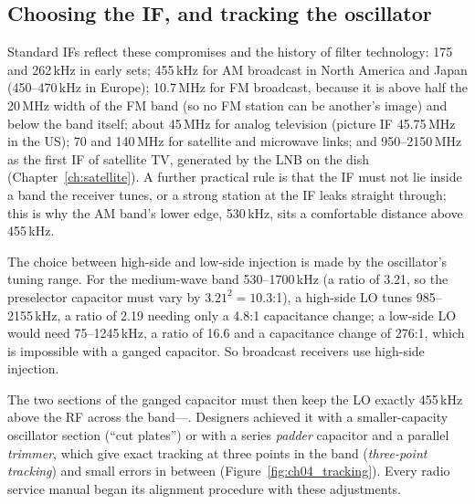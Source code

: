 \subsection{Choosing the IF, and tracking the oscillator}

Standard IFs reflect these compromises and the history of filter technology: 175 and 262\,kHz in early sets;
455\,kHz for AM broadcast in North America and Japan (450--470\,kHz in Europe); 10.7\,MHz for FM broadcast,
because it is above half the 20\,MHz width of the FM band (so no FM station can be another's image) and below
the band itself; about 45\,MHz for analog television (picture IF 45.75\,MHz in the US); 70 and 140\,MHz for
satellite and microwave links; and 950--2150\,MHz as the first IF of satellite TV, generated by the LNB on the
dish (Chapter~\ref{ch:satellite}). A further practical rule is that the IF must not lie inside a band the
receiver tunes, or a strong station at the IF leaks straight through; this is why the AM band's lower edge,
530\,kHz, sits a comfortable distance above 455\,kHz.

The choice between high-side and low-side injection is made by the oscillator's tuning range. For the
medium-wave band 530--1700\,kHz (a ratio of 3.21, so the preselector capacitor must vary by $3.21^2=10.3$:1),
a high-side LO tunes 985--2155\,kHz, a ratio of 2.19 needing only a 4.8:1 capacitance change; a low-side LO
would need 75--1245\,kHz, a ratio of 16.6 and a capacitance change of 276:1, which is impossible with a ganged
capacitor. So broadcast receivers use high-side injection.

The two sections of the ganged capacitor must then keep the LO exactly 455\,kHz above the RF across the
band---. Designers achieved it with a smaller-capacity oscillator section (``cut plates'') or
with a series \emph{padder} capacitor and a parallel \emph{trimmer}, which give exact tracking at three points
in the band (\emph{three-point tracking}) and small errors in between (Figure~\ref{fig:ch04_tracking}). Every
radio service manual began its alignment procedure with these adjustments.


